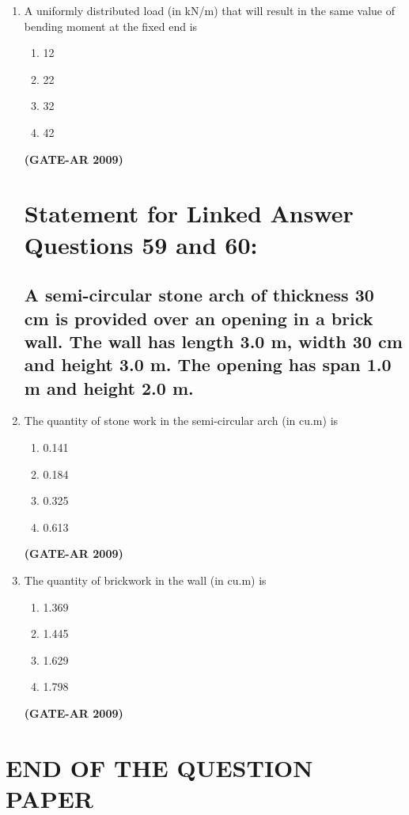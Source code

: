 \documentclass[a4paper,10pt]{article}
\begin{document}
\begin{enumerate}
    \item A uniformly distributed load (in kN/m) that will result in the same value of bending moment at the fixed end is 
    \begin{multicols}{4}
	\begin{enumerate}
        \item 12
        \item 22
        \item 32
        \item 42
    \end{enumerate}
	\end{multicols}
    \hfill \textbf{(GATE-AR 2009)}

\section*{Statement for Linked Answer Questions 59 and 60:}
\subsection*{A semi-circular stone arch of thickness 30 cm is provided over an opening in a brick wall. The wall has length 3.0 m, width 30 cm and height 3.0 m. The opening has span 1.0 m and height 2.0 m.}

    \item The quantity of stone work in the semi-circular arch (in cu.m) is 
    \begin{multicols}{4}
	\begin{enumerate}
        \item 0.141
        \item 0.184
        \item 0.325
        \item 0.613
    \end{enumerate}
	\end{multicols}
    \hfill \textbf{(GATE-AR 2009)}

    \item The quantity of brickwork in the wall (in cu.m) is 
    \begin{multicols}{4}
	\begin{enumerate}
        \item 1.369
        \item 1.445
        \item 1.629
        \item 1.798
    \end{enumerate}
	\end{multicols}
    \hfill \textbf{(GATE-AR 2009)}
    
\end{enumerate}

\centering
\section*{END OF THE QUESTION PAPER}
\end{document}
